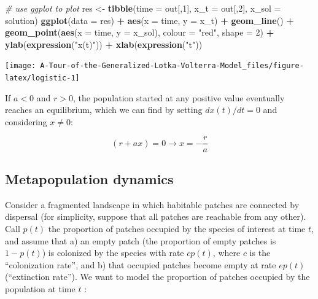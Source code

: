 \documentclass[]{book}
\newenvironment{Shaded}{\begin{snugshade}}{\end{snugshade}}
\newcommand{\CommentTok}[1]{\textcolor[rgb]{0.56,0.35,0.01}{\textit{#1}}}
\newcommand{\DataTypeTok}[1]{\textcolor[rgb]{0.13,0.29,0.53}{#1}}
\newcommand{\DecValTok}[1]{\textcolor[rgb]{0.00,0.00,0.81}{#1}}
\newcommand{\KeywordTok}[1]{\textcolor[rgb]{0.13,0.29,0.53}{\textbf{#1}}}
\newcommand{\NormalTok}[1]{#1}
\newcommand{\OperatorTok}[1]{\textcolor[rgb]{0.81,0.36,0.00}{\textbf{#1}}}
\newcommand{\StringTok}[1]{\textcolor[rgb]{0.31,0.60,0.02}{#1}}
\begin{document}
\begin{Shaded}
\begin{Highlighting}[]
\CommentTok{# use ggplot to plot}
\NormalTok{res <-}\StringTok{ }\KeywordTok{tibble}\NormalTok{(}\DataTypeTok{time =}\NormalTok{ out[,}\DecValTok{1}\NormalTok{], }\DataTypeTok{x_t =}\NormalTok{ out[,}\DecValTok{2}\NormalTok{], }\DataTypeTok{x_sol =}\NormalTok{ solution)}
\KeywordTok{ggplot}\NormalTok{(}\DataTypeTok{data =}\NormalTok{ res) }\OperatorTok{+}\StringTok{ }\KeywordTok{aes}\NormalTok{(}\DataTypeTok{x =}\NormalTok{ time, }\DataTypeTok{y =}\NormalTok{ x_t) }\OperatorTok{+}\StringTok{ }
\StringTok{  }\KeywordTok{geom_line}\NormalTok{() }\OperatorTok{+}\StringTok{ }
\StringTok{  }\KeywordTok{geom_point}\NormalTok{(}\KeywordTok{aes}\NormalTok{(}\DataTypeTok{x =}\NormalTok{ time, }\DataTypeTok{y =}\NormalTok{ x_sol), }\DataTypeTok{colour =} \StringTok{"red"}\NormalTok{, }\DataTypeTok{shape =} \DecValTok{2}\NormalTok{) }\OperatorTok{+}\StringTok{ }
\StringTok{  }\KeywordTok{ylab}\NormalTok{(}\KeywordTok{expression}\NormalTok{(}\StringTok{"x(t)"}\NormalTok{)) }\OperatorTok{+}\StringTok{ }\KeywordTok{xlab}\NormalTok{(}\KeywordTok{expression}\NormalTok{(}\StringTok{"t"}\NormalTok{))}
\end{Highlighting}
\end{Shaded}

\begin{center}\texttt{[image: A-Tour-of-the-Generalized-Lotka-Volterra-Model\_files/figure-latex/logistic-1]} \end{center}

If \(a < 0\) and \(r > 0\), the population started at any positive value eventually reaches an equilibrium, which we can find by setting \(dx(t)/dt = 0\) and considering \(x \neq 0\):

\[
(r + a x) = 0 \to x = -\frac{r}{a}
\]

\hypertarget{metapopulation-dynamics}{%
\subsection{Metapopulation dynamics}\label{metapopulation-dynamics}}

Consider a fragmented landscape in which habitable patches are connected by dispersal (for simplicity, suppose that all patches are reachable from any other). Call \(p(t)\) the proportion of patches occupied by the species of interest at time \(t\), and assume that a) an empty patch (the proportion of empty patches is \(1 - p(t)\)) is colonized by the species with rate \(c p(t)\), where \(c\) is the ``colonization rate'', and b) that occupied patches become empty at rate \(e p(t)\) (``extinction rate''). We want to model the proportion of patches occupied by the population at time \(t\) \citep{levins1969some}:
\end{document}
